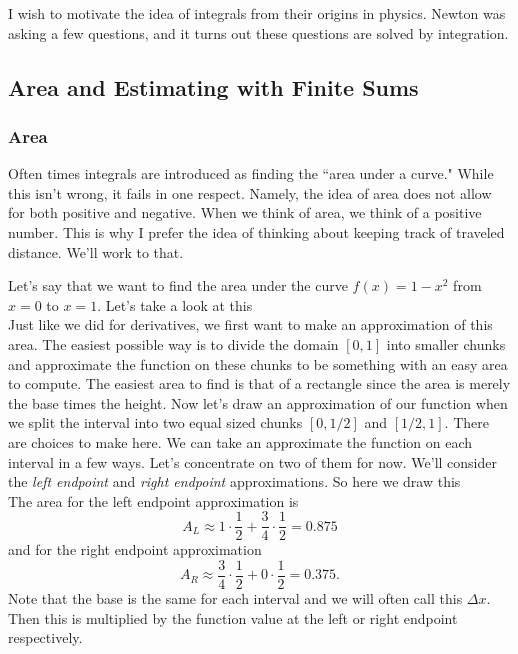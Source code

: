 \documentclass[leqno]{article}
\theoremstyle{definition}
\theoremstyle{remark}
\theoremstyle{theorem}
\begin{document}
I wish to motivate the idea of integrals from their origins in physics.  Newton was asking a few questions, and it turns out these questions are solved by integration.

\subsection{Area and Estimating with Finite Sums}

\subsubsection{Area}

Often times integrals are introduced as finding the ``area under a curve." While this isn't wrong, it fails in one respect. Namely, the idea of area does not allow for both positive and negative. When we think of area, we think of a positive number.  This is why I prefer the idea of thinking about keeping track of traveled distance.  We'll work to that.

Let's say that we want to find the area under the curve $f(x)=1-x^2$ from $x=0$ to $x=1$.  Let's take a look at this
\vspace*{5cm}\\

Just like we did for derivatives, we first want to make an approximation of this area.  The easiest possible way is to divide the domain $[0,1]$ into smaller chunks and approximate the function on these chunks to be something with an easy area to compute. The easiest area to find is that of a rectangle since the area is merely the base times the height.  Now let's draw an approximation of our function when we split the interval into two equal sized chunks $[0,1/2]$ and $[1/2,1]$. There are choices to make here. We can take an approximate the function on each interval in a few ways.  Let's concentrate on two of them for now.  We'll consider the \emph{left endpoint} and \emph{right endpoint} approximations. So here we draw this
\vspace*{5cm}\\

The area for the left endpoint approximation is
\[
A_L\approx 1\cdot \frac{1}{2} + \frac{3}{4}\cdot \frac{1}{2}=0.875
\]
and for the right endpoint approximation
\[
A_R \approx \frac{3}{4} \cdot \frac{1}{2} + 0 \cdot \frac{1}{2}=0.375.
\]
Note that the base is the same for each interval and we will often call this $\Delta x$.  Then this is multiplied by the function value at the left or right endpoint respectively.
\end{document}
